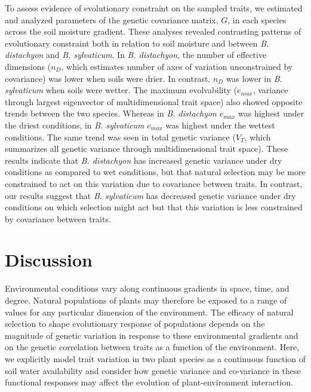 \documentclass[jou,floatsintext]{apa6}
\begin{document}
To assess evidence of evolutionary constraint on the sampled traits, we estimated and analyzed parameters of the genetic covariance matrix, \(G\), in each species across the soil moisture gradient. These analyses revealed contrasting patterns of evolutionary constraint both in relation to soil moisture and between \emph{B. distachyon} and \emph{B. sylvaticum}. In \emph{B. distachyon}, the number of effective dimensions (\(n_D\), which estimates number of axes of variation unconstrained by covariance) was lower when soils were drier. In contrast, \(n_D\) was lower in \emph{B. sylvaticum} when soils were wetter. The maximum evolvability (\(e_{max}\), variance through largest eigenvector of multidimensional trait space) also showed opposite trends between the two species. Whereas in \emph{B. distachyon} \(e_{max}\) was highest under the driest conditions, in \emph{B. sylvaticum} \(e_{max}\) was highest under the wettest conditions. The same trend was seen in total genetic variance (\(V_T\), which summarizes all genetic variance through multidimensional trait space). These results indicate that \emph{B. distachyon} has increased genetic variance under dry conditions as compared to wet conditions, but that natural selection may be more constrained to act on this variation due to covariance between traits. In contrast, our results suggest that \emph{B. sylvaticum} has decreased genetic variance under dry conditions on which selection might act but that this variation is less constrained by covariance between traits.

\hypertarget{discussion}{%
\section{Discussion}\label{discussion}}

Environmental conditions vary along continuous gradients in space, time, and degree. Natural populations of plants may therefore be exposed to a range of values for any particular dimension of the environment. The efficacy of natural selection to shape evolutionary response of populations depends on the magnitude of genetic variation in response to these environmental gradients and on the genetic correlation between traits as a function of the environment. Here, we explicitly model trait variation in two plant species as a continuous function of soil water availability and consider how genetic variance and co-variance in these functional responses may affect the evolution of plant-environment interaction.
\end{document}
